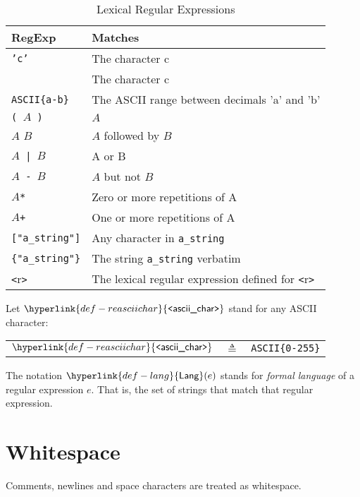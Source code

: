 \documentclass{book}
\newcommand\Char[1]{\fbox{#1}}
\newcommand\REasciichar[0]{\hyperlink{def-reasciichar}{\texttt{<}\textsf{ascii\_char}\texttt{>}}}
\newcommand\Lang[0]{\hyperlink{def-lang}{\textsf{Lang}}}
\begin{document}
\begin{table}
\caption{Lexical Regular Expressions \label{ta:LexicalRegularExpressions}}
\begin{center}
\begin{tabular}{ll}
\hline
\textbf{RegExp} & \textbf{Matches}\\
\hline
\texttt{'c'}              & The character c\\
\Char{c}                  & The character c\\
\texttt{ASCII\{a-b\}}       & The ASCII range between decimals 'a' and 'b'\\
\texttt{( $A$ )}          & $A$\\
$A$ $B$                   & $A$ followed by $B$\\
\texttt{$A$ | $B$}        & A or B\\
\texttt{$A$ - $B$}        & $A$ but not $B$\\
\texttt{$A$*}             & Zero or more repetitions of A\\
\texttt{$A$+}             & One or more repetitions of A\\
\texttt{["a\_string"]}    & Any character in \texttt{a\_string}\\
\texttt{\{"a\_string"\}}  & The string \texttt{a\_string} verbatim\\
\texttt{<}r\texttt{>}     & The lexical regular expression defined for \texttt{<}r\texttt{>}\\
\hline
\end{tabular}
\end{center}
\end{table}

\hypertarget{def-reasciichar}{}
Let $\REasciichar$ stand for any ASCII character:
\begin{center}
\begin{tabular}{rcl}
$\REasciichar$  &$\triangleq$& \texttt{ASCII\{0-255\}}
\end{tabular}
\end{center}

\hypertarget{def-lang}{}
The notation $\Lang(e)$ stands for \emph{formal language} of a regular expression $e$.
That is, the set of strings that match that regular expression.

\section{Whitespace}
Comments, newlines and space characters are treated as whitespace.
\end{document}
